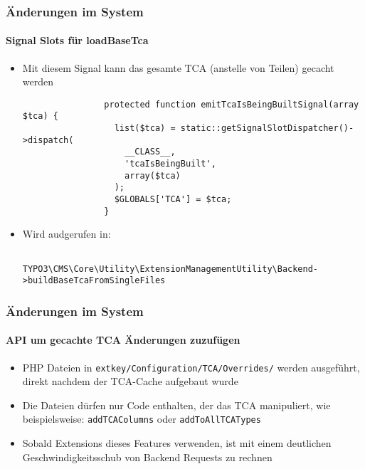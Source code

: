\begin{frame}[fragile]
	\frametitle{Änderungen im System}
	\framesubtitle{Signal Slots für loadBaseTca}

	\begin{itemize}
		\item Mit diesem Signal kann das gesamte TCA (anstelle von Teilen) gecacht werden

			\begin{lstlisting}
				protected function emitTcaIsBeingBuiltSignal(array $tca) {
				  list($tca) = static::getSignalSlotDispatcher()->dispatch(
				    __CLASS__,
				    'tcaIsBeingBuilt',
				    array($tca)
				  );
				  $GLOBALS['TCA'] = $tca;
				}
			\end{lstlisting}

		\item Wird audgerufen in:

			\begin{lstlisting}
				TYPO3\CMS\Core\Utility\ExtensionManagementUtility\Backend->buildBaseTcaFromSingleFiles
			\end{lstlisting}

	\end{itemize}

\end{frame}


\begin{frame}[fragile]
	\frametitle{Änderungen im System}
	\framesubtitle{API um gecachte TCA Änderungen zuzufügen}

	\begin{itemize}
		\item PHP Dateien in \texttt{extkey/Configuration/TCA/Overrides/}
			werden ausgeführt, direkt nachdem der TCA-Cache aufgebaut wurde

		\item Die Dateien dürfen nur Code enthalten, der das TCA manipuliert,\newline
			wie beispielsweise: \texttt{addTCAColumns} oder \texttt{addToAllTCATypes}

		\item Sobald Extensions dieses Features verwenden, ist mit einem deutlichen
			Geschwindigkeitsschub von Backend Requests zu rechnen

	\end{itemize}

\end{frame}

